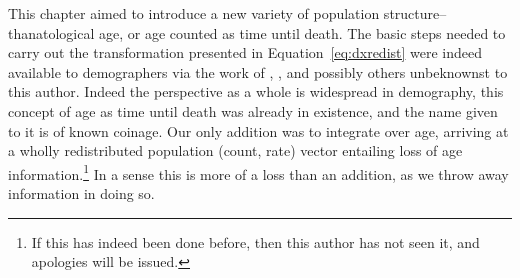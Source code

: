 \FloatBarrier
\label{sec:esfrreflections}
This chapter aimed to introduce a new variety of population structure--
thanatological age, or age counted as time until death. The basic steps needed
to carry out the transformation presented in Equation~\ref{eq:dxredist} were
indeed available to demographers via the work of
\citet{miller2001increasing}, \citet{lee2002approach}, \citet{vaupel2009life}
and possibly others unbeknownst to this author. Indeed the perspective as a
whole is widespread in demography, this concept of age as time until death
was already in existence, and the name given to it is of known coinage. Our only
addition was to integrate over age, arriving at a wholly 
redistributed population (count, rate) vector entailing loss of age
information.\footnote{If this has indeed been done before, then this author has
not seen it, and apologies will be issued.} In a sense this is more of a loss
than an addition, as we throw away information in doing so. 


